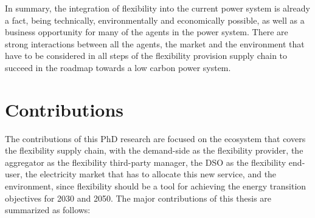 In summary, the integration of flexibility into the current power system is already a fact, being technically, environmentally and economically possible, as well as a business opportunity for many of the agents in the power system. There are strong interactions between all the agents, the market and the environment that have to be considered in all steps of the flexibility provision supply chain to succeed in the roadmap towards a low carbon power system. 
     
\section{Contributions}
The contributions of this PhD research are focused on the ecosystem that covers the flexibility supply chain, with the demand-side as the flexibility provider, the aggregator as the flexibility third-party manager, the DSO as the flexibility end-user, the electricity market that has to allocate this new service, and the environment, since flexibility should be a tool for achieving the energy transition objectives for 2030 and 2050. The major contributions of this thesis are summarized as follows:  
